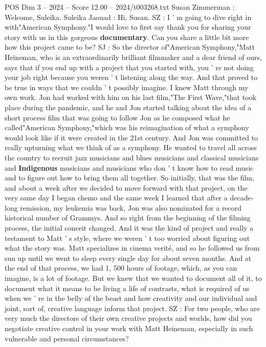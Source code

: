 \begin{textsample}{POS Dim 3 – 2024 – Score 12.00 – 2024/t003268.txt}  \label{ex:f3_pos_025}
Susan Zimmerman : Welcome, Suleika.
Suleika Jaouad : Hi, Susan.
SZ : I ' m going to dive right in with"American Symphony."I would love to first say thank you for sharing your story with us in this gorgeous \textbf{documentary}.
Can you share a little bit more how this project came to be?
SJ : So the director of"American Symphony,"Matt Heineman, who is an extraordinarily brilliant filmmaker and a dear friend of ours, says that if you end up with a project that you started with, you ' re not doing your job right because you weren ' t listening along the way.
And that proved to be true in ways that we couldn ' t possibly imagine.
I knew Matt through my own work.
Jon had worked with him on his last film,"The First Wave,"that took place during the pandemic, and he and Jon started talking about the idea of a short process film that was going to follow Jon as he composed what he called"American Symphony,"which was his reimagination of what a symphony would look like if it were created in the 21st century.
And Jon was committed to really upturning what we think of as a symphony.
He wanted to travel all across the country to recruit jazz musicians and blues musicians and classical musicians and \textbf{Indigenous} musicians and musicians who don ' t know how to read music and to figure out how to bring them all together.
So initially, that was the film, and about a week after we decided to move forward with that project, on the very same day I began chemo and the same week I learned that after a decade-long remission, my leukemia was back, Jon was also nominated for a record historical number of Grammys.
And so right from the beginning of the filming process, the initial conceit changed.
And it was the kind of project and really a testament to Matt ' s style, where we weren ' t too worried about figuring out what the story was.
Matt specializes in cinema verité, and so he followed us from sun up until we went to sleep every single day for about seven months.
And at the end of that process, we had 1, 500 hours of footage, which, as you can imagine, is a lot of footage.
But we knew that we wanted to document all of it, to document what it means to be living a life of contrasts, what is required of us when we ' re in the belly of the beast and how creativity and our individual and joint, sort of, creative language inform that project.
SZ : For two people, who are very much the directors of their own creative projects and worlds, how did you negotiate creative control in your work with Matt Heineman, especially in such vulnerable and personal circumstances?

\end{textsample}
